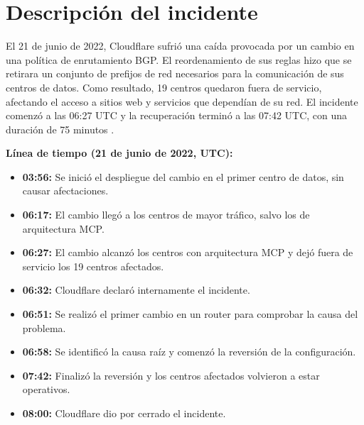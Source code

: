 
\section{Descripción del incidente}

El 21 de junio de 2022, Cloudflare sufrió una caída
provocada por un cambio en una política de enrutamiento
BGP. El reordenamiento de sus reglas hizo que se retirara
un conjunto de prefijos de red necesarios para la
comunicación de sus centros de datos. Como resultado,
19 centros quedaron fuera de servicio, afectando el
acceso a sitios web y servicios que dependían de su red.
El incidente comenzó a las 06:27 UTC y la recuperación
terminó a las 07:42 UTC, con una duración de 75 minutos
\cite{cloudflare2022}.

\textbf{Línea de tiempo (21 de junio de 2022, UTC):}
\begin{itemize}
    \item \textbf{03:56:} Se inició el despliegue del cambio
    en el primer centro de datos, sin causar afectaciones.
    \item \textbf{06:17:} El cambio llegó a los centros
    de mayor tráfico, salvo los de arquitectura MCP.
    \item \textbf{06:27:} El cambio alcanzó los centros
    con arquitectura MCP y dejó fuera de servicio
    los 19 centros afectados.
    \item \textbf{06:32:} Cloudflare declaró internamente
    el incidente.
    \item \textbf{06:51:} Se realizó el primer cambio
    en un router para comprobar la causa del problema.
    \item \textbf{06:58:} Se identificó la causa raíz
    y comenzó la reversión de la configuración.
    \item \textbf{07:42:} Finalizó la reversión y los
    centros afectados volvieron a estar operativos.
    \item \textbf{08:00:} Cloudflare dio por cerrado
    el incidente.
\end{itemize}
